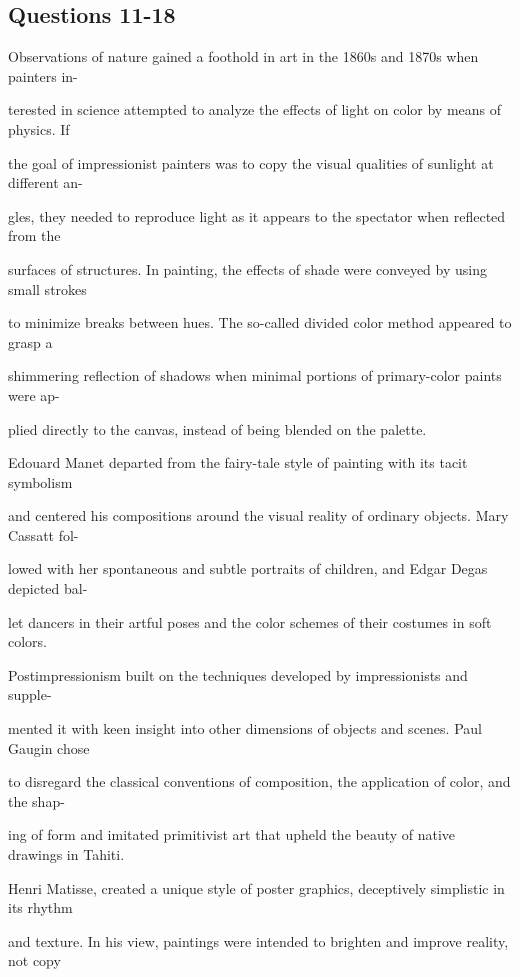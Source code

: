 \documentclass[12pt]{article}
\begin{document}
\subsection*{Questions 11-18}
\begingroup
\small
\sloppy
\setlength{\parskip}{0pt}
\setlength{\parindent}{0pt}
Observations of nature gained a foothold in art in the 1860s and 1870s when painters in-\par
terested in science attempted to analyze the effects of light on color by means of physics. If\par
the goal of impressionist painters was to copy the visual qualities of sunlight at different an-\par
gles, they needed to reproduce light as it appears to the spectator when reflected from the\par
surfaces of structures. In painting, the effects of shade were conveyed by using small strokes\par
to minimize breaks between hues. The so-called divided color method appeared to grasp a\par
shimmering reflection of shadows when minimal portions of primary-color paints were ap-\par
plied directly to the canvas, instead of being blended on the palette.\par
Edouard Manet departed from the fairy-tale style of painting with its tacit symbolism\par
and centered his compositions around the visual reality of ordinary objects. Mary Cassatt fol-\par
lowed with her spontaneous and subtle portraits of children, and Edgar Degas depicted bal-\par
let dancers in their artful poses and the color schemes of their costumes in soft colors.\par
Postimpressionism built on the techniques developed by impressionists and supple-\par
mented it with keen insight into other dimensions of objects and scenes. Paul Gaugin chose\par
to disregard the classical conventions of composition, the application of color, and the shap-\par
ing of form and imitated primitivist art that upheld the beauty of native drawings in Tahiti.\par
Henri Matisse, created a unique style of poster graphics, deceptively simplistic in its rhythm\par
and texture. In his view, paintings were intended to brighten and improve reality, not copy\par
\end{document}
